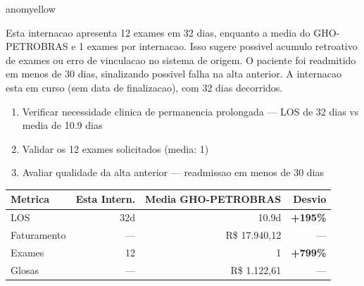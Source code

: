 \documentclass[a4paper,10pt]{article}
\begin{document}
\begin{anomalycard}[Internacao 165934 | GHO-PETROBRAS | MODERADO (z=2.69)]{anomyellow}
\vspace{2pt}\begin{tcolorbox}[colback=severityred!20,colframe=anomyellow,title={\textbf{Interpretacao de Negocio}},fonttitle=\bfseries\small,left=4pt,right=4pt,top=3pt,bottom=3pt]
{\small Esta internacao apresenta 12 exames em 32 dias, enquanto a media do GHO-PETROBRAS e 1 exames por internacao. Isso sugere possivel acumulo retroativo de exames ou erro de vinculacao no sistema de origem. O paciente foi readmitido em menos de 30 dias, sinalizando possivel falha na alta anterior. A internacao esta em curso (sem data de finalizacao), com 32 dias decorridos.}
\end{tcolorbox}
\begin{tcolorbox}[colback=severityyellow!30,colframe=anomorange,title={\textbf{Recomendacoes Especificas}},fonttitle=\bfseries\small,left=4pt,right=4pt,top=3pt,bottom=3pt]
\begin{enumerate}[nosep,leftmargin=16pt]
\item {\small Verificar necessidade clinica de permanencia prolongada --- LOS de 32 dias vs media de 10.9 dias}
\item {\small Validar os 12 exames solicitados (media: 1)}
\item {\small Avaliar qualidade da alta anterior --- readmissao em menos de 30 dias}
\end{enumerate}
\end{tcolorbox}
\begin{center}\begin{tabular}{l r r r}\toprule\textbf{Metrica} & \textbf{Esta Intern.} & \textbf{Media GHO-PETROBRAS} & \textbf{Desvio} \\\midrule
LOS & 32d & 10.9d & \textcolor{anomred}{\textbf{+195\%}} \\
Faturamento & --- & R\$ 17.940,12 & --- \\
Exames & 12 & 1 & \textcolor{anomred}{\textbf{+799\%}} \\
Glosas & --- & R\$ 1.122,61 & --- \\
\bottomrule\end{tabular}\end{center}


\end{anomalycard}
\end{document}
